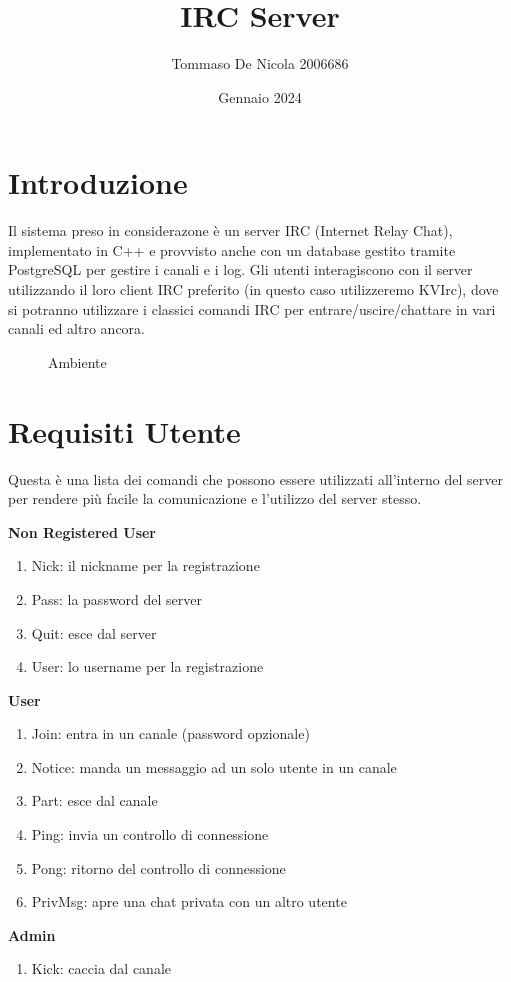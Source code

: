 \documentclass{article}
\title{IRC Server}
\author{Tommaso De Nicola 2006686}
\date{Gennaio 2024}
\begin{document}
\maketitle

\section{Introduzione}
\fontsize{12pt}{14pt}\selectfont
Il sistema preso in considerazone è un server IRC (Internet Relay Chat), implementato in C++ e provvisto anche con un database gestito tramite PostgreSQL per gestire i canali e i log. Gli utenti interagiscono con il server utilizzando il loro client IRC preferito (in questo caso utilizzeremo KVIrc), dove si potranno utilizzare i classici comandi IRC per entrare/uscire/chattare in vari canali ed altro ancora.

\vspace{12pt}

\begin{figure}[ht]
    \centering
    
    \caption{Ambiente}
    \label{fig:environment.svg}
\end{figure}

\newpage


\section{Requisiti Utente}

Questa è una lista dei comandi che possono essere utilizzati all'interno del server per rendere più facile la comunicazione e l'utilizzo del server stesso.
\vspace{12pt}

\textbf{Non Registered User}
\begin{enumerate}
    \item Nick: il nickname per la registrazione
    \item Pass: la password del server
    \item Quit: esce dal server
    \item User: lo username per la registrazione
\end{enumerate}
\textbf{User}
\begin{enumerate}
    \item Join: entra in un canale (password opzionale)
    \item Notice: manda un messaggio ad un solo utente in un canale
    \item Part: esce dal canale
    \item Ping: invia un controllo di connessione
    \item Pong: ritorno del controllo di connessione
    \item PrivMsg: apre una chat privata con un altro utente
\end{enumerate}
\textbf{Admin}
\begin{enumerate}
    \item Kick: caccia dal canale
\end{enumerate}
\end{document}
